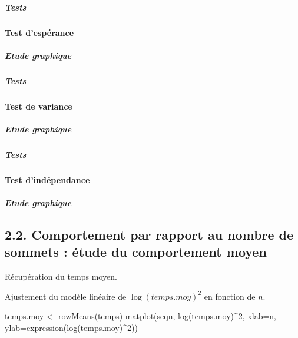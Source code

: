 \documentclass[
]{article}
\newenvironment{Shaded}{\begin{snugshade}}{\end{snugshade}}
\newcommand{\AttributeTok}[1]{\textcolor[rgb]{0.77,0.63,0.00}{#1}}
\newcommand{\DecValTok}[1]{\textcolor[rgb]{0.00,0.00,0.81}{#1}}
\newcommand{\FunctionTok}[1]{\textcolor[rgb]{0.00,0.00,0.00}{#1}}
\newcommand{\NormalTok}[1]{#1}
\newcommand{\OtherTok}[1]{\textcolor[rgb]{0.56,0.35,0.01}{#1}}
\newcommand{\SpecialCharTok}[1]{\textcolor[rgb]{0.00,0.00,0.00}{#1}}
\newcommand{\StringTok}[1]{\textcolor[rgb]{0.31,0.60,0.02}{#1}}
\begin{document}
\hypertarget{tests}{%
\subparagraph{Tests}\label{tests}}

\hypertarget{test-despuxe9rance}{%
\paragraph{Test d'espérance}\label{test-despuxe9rance}}

\hypertarget{etude-graphique-1}{%
\subparagraph{Etude graphique}\label{etude-graphique-1}}

\hypertarget{tests-1}{%
\subparagraph{Tests}\label{tests-1}}

\hypertarget{test-de-variance}{%
\paragraph{Test de variance}\label{test-de-variance}}

\hypertarget{etude-graphique-2}{%
\subparagraph{Etude graphique}\label{etude-graphique-2}}

\hypertarget{tests-2}{%
\subparagraph{Tests}\label{tests-2}}

\hypertarget{test-dinduxe9pendance}{%
\paragraph{Test d'indépendance}\label{test-dinduxe9pendance}}

\hypertarget{etude-graphique-3}{%
\subparagraph{Etude graphique}\label{etude-graphique-3}}

\hypertarget{comportement-par-rapport-au-nombre-de-sommets-uxe9tude-du-comportement-moyen}{%
\subsection{2.2. Comportement par rapport au nombre de sommets : étude
du comportement
moyen}\label{comportement-par-rapport-au-nombre-de-sommets-uxe9tude-du-comportement-moyen}}

Récupération du temps moyen.

Ajustement du modèle linéaire de \(\log(temps.moy)^2\) en fonction de
\(n\).

\begin{Shaded}
\begin{Highlighting}[]
\NormalTok{temps.moy }\OtherTok{\textless{}{-}} \FunctionTok{rowMeans}\NormalTok{(temps)}
\FunctionTok{matplot}\NormalTok{(seqn, }\FunctionTok{log}\NormalTok{(temps.moy)}\SpecialCharTok{\^{}}\DecValTok{2}\NormalTok{, }\AttributeTok{xlab=}\StringTok{\textquotesingle{}n\textquotesingle{}}\NormalTok{, }\AttributeTok{ylab=}\FunctionTok{expression}\NormalTok{(}\FunctionTok{log}\NormalTok{(temps.moy)}\SpecialCharTok{\^{}}\DecValTok{2}\NormalTok{))}
\end{Highlighting}
\end{Shaded}
\end{document}
